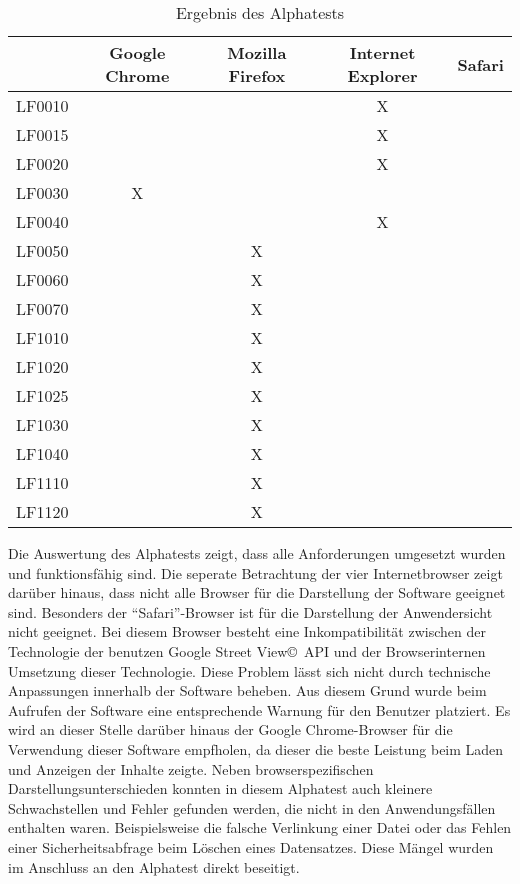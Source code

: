 \begin{table}[htbp]
  \centering
    \begin{tabular}{l|cccc}
    \toprule
          & Google Chrome & Mozilla Firefox & Internet Explorer & Safari \\
    \midrule
    LF0010 &       &       & X     &  \\
    LF0015 &       &       & X     &  \\
    LF0020 &       &       & X     &  \\
    LF0030 & X     &       &       &  \\
    LF0040 &       &       & X     &  \\
    LF0050 &       & X     &       &  \\
    LF0060 &       & X     &       &  \\
    LF0070 &       & X     &       &  \\
    LF1010 &       & X     &       &  \\
    LF1020 &       & X     &       &  \\
    LF1025 &       & X     &       &  \\
    LF1030 &       & X     &       &  \\
    LF1040 &       & X     &       &  \\
    LF1110 &       & X     &       &  \\
    LF1120 &       & X     &       &  \\
    \bottomrule
    \end{tabular}
  \caption{Ergebnis des Alphatests}
  \label{tab:ErgebnisAlphatest}
\end{table}


Die Auswertung des Alphatests zeigt, dass alle Anforderungen umgesetzt wurden und funktionsfähig sind. Die seperate Betrachtung der vier Internetbrowser zeigt darüber hinaus, dass nicht alle Browser für die Darstellung der Software geeignet sind. Besonders der "`Safari"'-Browser ist für die Darstellung der Anwendersicht nicht geeignet. Bei diesem Browser besteht eine Inkompatibilität zwischen der Technologie der benutzen Google Street View\copyright\ API und der Browserinternen Umsetzung dieser Technologie. Diese Problem lässt sich nicht durch technische Anpassungen innerhalb der Software beheben. Aus diesem Grund wurde beim Aufrufen der Software eine entsprechende Warnung für den Benutzer platziert. Es wird an dieser Stelle darüber hinaus der Google Chrome-Browser für die Verwendung dieser Software empfholen, da dieser die beste Leistung beim Laden und Anzeigen der Inhalte zeigte. Neben browserspezifischen Darstellungsunterschieden konnten in diesem Alphatest auch kleinere Schwachstellen und Fehler gefunden werden, die nicht in den Anwendungsfällen enthalten waren. Beispielsweise die falsche Verlinkung einer Datei oder das Fehlen einer Sicherheitsabfrage beim Löschen eines Datensatzes. Diese Mängel wurden im Anschluss an den Alphatest direkt beseitigt.